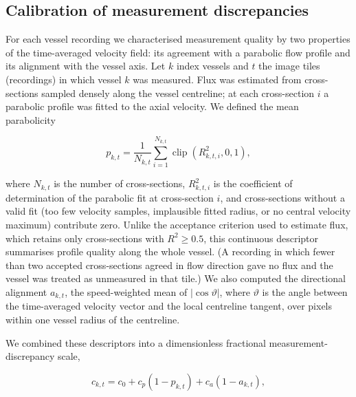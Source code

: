 
\subsection*{Calibration of measurement discrepancies}

For each vessel recording we characterised measurement quality by two properties of the time-averaged velocity field:
its agreement with a parabolic flow profile and its alignment with the vessel axis. Let $k$ index vessels and $t$ the
image tiles (recordings) in which vessel $k$ was measured. Flux was estimated from cross-sections sampled densely along
the vessel centreline; at each cross-section $i$ a parabolic profile was fitted to the axial velocity. We defined the
mean parabolicity

\begin{equation}
p_{k,t}
=
\frac{1}{N_{k,t}}
\sum_{i=1}^{N_{k,t}}
\operatorname{clip}\!\left(R_{k,t,i}^2,0,1\right),
\label{eq:parabolicity}
\end{equation}

where $N_{k,t}$ is the number of cross-sections, $R_{k,t,i}^2$ is the coefficient of determination of the parabolic fit
at cross-section $i$, and cross-sections without a valid fit (too few velocity samples, implausible fitted radius, or no
central velocity maximum) contribute zero. Unlike the acceptance criterion used to estimate flux, which retains only
cross-sections with $R^2 \geq 0.5$, this continuous descriptor summarises profile quality along the whole vessel.
(A recording in which fewer than two accepted cross-sections agreed in flow direction gave no flux and the vessel was
treated as unmeasured in that tile.) We
also computed the directional alignment $a_{k,t}$, the speed-weighted mean of $|\cos\vartheta|$, where $\vartheta$ is the
angle between the time-averaged velocity vector and the local centreline tangent, over pixels within one vessel radius
of the centreline.

We combined these descriptors into a dimensionless fractional measurement-discrepancy scale,

\begin{equation}
c_{k,t}
=
c_0
+ c_p(1-p_{k,t})
+ c_a(1-a_{k,t}),
\label{eq:measurement_uncertainty}
\end{equation}

